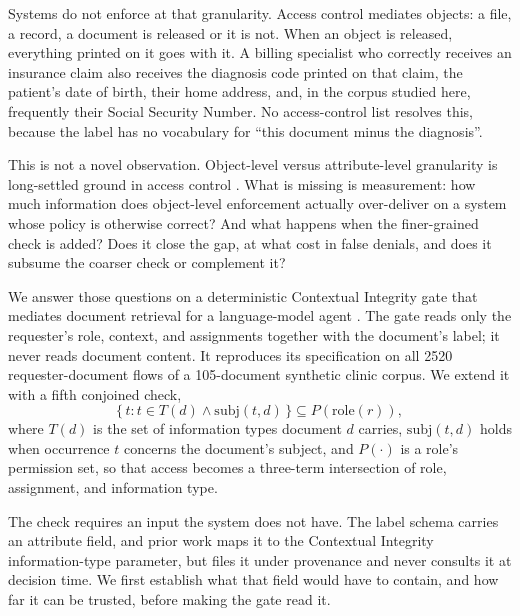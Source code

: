\documentclass[conference]{IEEEtran}
\begin{document}
Systems do not enforce at that granularity. Access control mediates objects: a
file, a record, a document is released or it is not. When an object is released,
everything printed on it goes with it. A billing specialist who correctly
receives an insurance claim also receives the diagnosis code printed on that
claim, the patient's date of birth, their home address, and, in the corpus
studied here, frequently their Social Security Number. No access-control list
resolves this, because the label has no vocabulary for ``this document minus the
diagnosis''.

This is not a novel observation. Object-level versus attribute-level granularity
is long-settled ground in access control \cite{b3}. What is missing is
measurement: how much information does object-level enforcement actually
over-deliver on a system whose policy is otherwise correct? And what happens
when the finer-grained check is added? Does it close the gap, at what cost in
false denials, and does it subsume the coarser check or complement it?

We answer those questions on a deterministic Contextual Integrity gate that
mediates document retrieval for a language-model agent \cite{b4}. The gate reads
only the requester's role, context, and assignments together with the document's
label; it never reads document content. It reproduces its specification on all
2520 requester-document flows of a 105-document synthetic clinic corpus. We
extend it with a fifth conjoined check,
\begin{equation}
\{\, t : t \in T(d) \wedge \mathrm{subj}(t,d) \,\} \subseteq P(\mathrm{role}(r)),
\label{eq:check}
\end{equation}
where $T(d)$ is the set of information types document $d$ carries,
$\mathrm{subj}(t,d)$ holds when occurrence $t$ concerns the document's subject,
and $P(\cdot)$ is a role's permission set, so that access becomes a three-term
intersection of role, assignment, and information type.

The check requires an input the system does not have. The label schema carries
an attribute field, and prior work maps it to the Contextual Integrity
information-type parameter, but files it under provenance and never consults it
at decision time. We first establish what that field would have to contain, and
how far it can be trusted, before making the gate read it.
\end{document}
